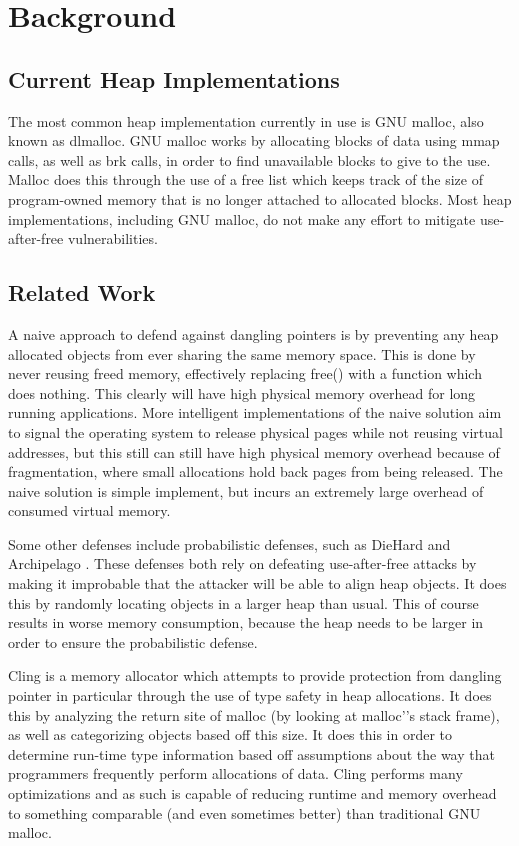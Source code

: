 \documentclass[conference]{IEEEtran}
\begin{document}
\section{Background}

\subsection{Current Heap Implementations}
The most common heap implementation currently in use is GNU malloc, also 
known as dlmalloc. GNU malloc works by allocating blocks of data using mmap 
calls, as well as brk calls, in order to find unavailable blocks to give to 
the use. Malloc does this through the use of a free list which keeps track 
of the size of program-owned memory that is no longer attached to allocated 
blocks.  Most heap implementations, including GNU malloc, do not make any effort to mitigate use-after-free vulnerabilities. 

\subsection{Related Work}
A naive approach to defend against dangling pointers is by preventing any 
heap allocated objects from ever sharing the same memory space. This is done 
by never reusing freed memory, effectively replacing free() with a function 
which does nothing. This clearly will have high physical memory overhead for long running applications. More intelligent implementations of the naive solution aim to signal the operating system to release physical pages while not reusing virtual addresses, but this still can still have high physical memory overhead because of fragmentation, where small allocations hold back pages from being released.  The naive solution is simple implement, but incurs an extremely large overhead of consumed virtual memory.

Some other defenses include probabilistic defenses, such as DieHard \cite{b2}
and Archipelago \cite{b3}. These defenses both rely on defeating 
use-after-free attacks by making it improbable that the attacker will be able 
to align heap objects. It does this by randomly locating objects in a larger 
heap than usual. This of course results in worse memory consumption, because 
the heap needs to be larger in order to ensure the probabilistic defense.

Cling \cite{b1} is a memory allocator which attempts to provide protection 
from dangling pointer in particular through the use of type safety in heap 
allocations. It does this by analyzing the return site of malloc (by looking 
at malloc'’s stack frame), as well as categorizing objects based off this size. 
It does this in order to determine run-time type information based off 
assumptions about the way that programmers frequently perform allocations of data. Cling performs many optimizations and as such is capable of 
reducing runtime and memory overhead to something comparable (and even 
sometimes better) than traditional GNU malloc. 
\end{document}
